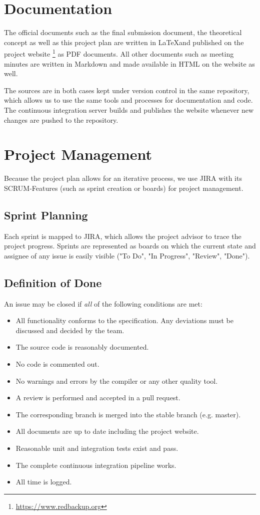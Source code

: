 \section{Documentation}
The official documents such as the final submission document, the theoretical concept as well as this project plan are written in \LaTeX and published on the project website \footnote{\url{https://www.redbackup.org}} as PDF documents. All other documents such as meeting minutes are written in Markdown and made available in HTML on the website as well.

The sources are in both cases kept under version control in the same repository, which allows us to use the same tools and processes for documentation and code. The continuous integration server builds and publishes the website whenever new changes are pushed to the repository.

\section{Project Management}
Because the project plan allows for an iterative process, we use JIRA with its SCRUM-Features (such as sprint creation or boards) for project management.

\subsection{Sprint Planning}
Each sprint is mapped to JIRA, which allows the project advisor to trace the project progress. Sprints are represented as boards on which the current state and assignee of any issue is easily visible ("To Do", "In Progress", "Review", "Done").


\subsection{Definition of Done}
An issue may be closed if \emph{all} of the following conditions are met:

\begin{itemize}
	\item All functionality conforms to the specification. Any deviations must be discussed and decided by the team.
	\item The source code is reasonably documented.
	\item No code is commented out.
	\item No warnings and errors by the compiler or any other quality tool.
	\item A review is performed and accepted in a pull request.
	\item The corresponding branch is merged into the stable branch (e.g. master).
	\item All documents are up to date including the project website.
	\item Reasonable unit and integration tests exist and pass.
	\item The complete continuous integration pipeline works.
	\item All time is logged.
\end{itemize}

